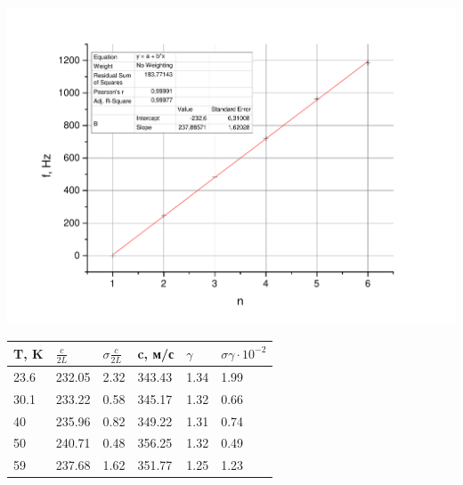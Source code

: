 \documentclass[a4paper,12pt]{article}
\begin{document}
		\includegraphics[width = 0.9\linewidth]{Graph5gr}
		
		\begin{center}
			\begin{tabular}{l | l | l | l | l | l}
				T, K & $\frac{c}{2L}$ & $\sigma\frac{c}{2L}$ & c, м/с & $\gamma$ & $\sigma\gamma\cdot 10^{-2}$\\ \hline
				23.6 & 232.05 & 2.32 & 343.43 & 1.34 & 1.99\\ \hline
				30.1 & 233.22 & 0.58 & 345.17 & 1.32 & 0.66  \\ \hline
				40 & 235.96 & 0.82 & 349.22 & 1.31 & 0.74  \\ \hline
				50 & 240.71 & 0.48 & 356.25 & 1.32 & 0.49  \\ \hline
				59 & 237.68 & 1.62 & 351.77 & 1.25 & 1.23  \\ \hline
			\end{tabular}
		\end{center}
\end{document}
